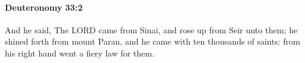 
		\paragraph{Deuteronomy 33:2} %
			\label{DEUTERONOMY-33-2}

			And he said, The LORD came from Sinai, and rose up from Seir unto them; he shined forth from mount Paran, and he came with ten thousands of saints: from his right hand went a fiery law for them.


